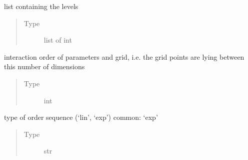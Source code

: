 \documentclass[letterpaper,10pt,english,openany,oneside]{sphinxmanual}
\begin{document}
\begin{fulllineitems}
\begin{fulllineitems}
\begin{quote}
\begin{description}
\end{description}\end{quote}

\end{fulllineitems}


\begin{fulllineitems}
\label{\detokenize{pygpc:pygpc.Grid.SparseGrid.level_sequence}}
list containing the levels
\begin{quote}\begin{description}
\item[{Type}] \leavevmode
list of int

\end{description}\end{quote}

\end{fulllineitems}


\begin{fulllineitems}
\label{\detokenize{pygpc:pygpc.Grid.SparseGrid.interaction_order}}
interaction order of parameters and grid, i.e. the grid points are lying between this number of dimensions
\begin{quote}\begin{description}
\item[{Type}] \leavevmode
int

\end{description}\end{quote}

\end{fulllineitems}


\begin{fulllineitems}
\label{\detokenize{pygpc:pygpc.Grid.SparseGrid.order_sequence_type}}
type of order sequence (‘lin’, ‘exp’) common: ‘exp’
\begin{quote}\begin{description}
\item[{Type}] \leavevmode
str


\end{description}
\end{quote}
\end{fulllineitems}
\end{fulllineitems}
\end{document}
